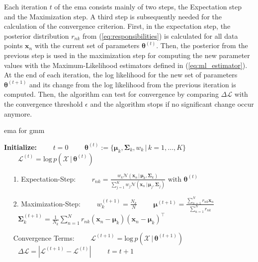 \documentclass[../../../main.tex]{subfiles}
\begin{document}
Each iteration $t$ of the \acrshort{ema} consists mainly of two steps, the Expectation step and the Maximization step. A third step is subsequently needed for the calculation of the convergence criterion. First, in the expectation step, the posterior distribution $r_{nk}$ from (\ref{eq:responsibilities}) is calculated for all data points $\bm{x}_n$ with the current set of parameters $\bm{\theta}^{(t)}$. Then, the posterior from the previous step is used in the maximization step for computing the new parameter values with the Maximum-Likelihood estimators defined in (\ref{eq:ml_estimator}). At the end of each iteration, the log likelihood for the new set of parameters $\bm{\theta}^{(t+1)}$ and its change from the log likelihood from the previous iteration is computed. Then, the algorithm can test for convergence by comparing $\Delta \mathcal{L}$ with the convergence threshold $\epsilon$ and the algorithm stops if no significant change occur anymore.

\begin{algorithm}
    \caption{\gls{ema} for \gls{gmm}}
    \label{alg:ema_gmm}
    \begin{algorithmic}[1]
        \STATEx \textbf{Initialize:}
        \STATE $\qquad t = 0$
        \STATE $\qquad \bm{\theta}^{(t)} := \{ \bm{\mu}_k, \bm{\Sigma}_k, w_k \, | \, k=1,\dots,K \}$
        \STATE $\qquad \mathcal{L}^{(t)} = \text{log} \, p(\mathcal{X} \, | \, \bm{\theta}^{(t)})$

            \STATEx $\quad$ 1. Expectation-Step:
            \STATE $\qquad r_{nk} = \frac{w_k \mathcal{N}(\bm{x}_n \, | \, \bm{\mu}_k, \bm{\Sigma}_k)}{\sum_{j=1}^K w_j \mathcal{N}(\bm{x}_n \, | \, \bm{\mu}_j, \bm{\Sigma}_j)} \text{ with } \bm{\theta}^{(t)}$

            \STATEx $\quad$ 2. Maximization-Step:
            \STATE $\qquad w_k^{(t+1)} = \frac{N_k}{N}$
            \STATE $\qquad \bm{\mu}^{(t+1)} = \frac{\sum_{n=1}^N r_{nk} \bm{x}_n}{\sum_{n=1}^N r_{nk}}$
            \STATE $\qquad \bm{\Sigma}_k^{(t+1)} = \frac{1}{N_k}\sum_{n=1}^N r_{nk}(\bm{x}_n-\bm{\mu}_k)(\bm{x}_n-\bm{\mu}_k)^\top$

            \STATEx $\quad$ Convergence Terms:
            \STATE $\qquad \mathcal{L}^{(t+1)} = \text{log} \, p(\mathcal{X} \, | \, \bm{\theta}^{(t+1)})$
            \STATE $\qquad \Delta \mathcal{L} = | \mathcal{L}^{(t+1)} - \mathcal{L}^{(t)} |$
            \STATE $\qquad t = t+1$

        \ENDWHILE
    \end{algorithmic}
 \end{algorithm}
\end{document}
